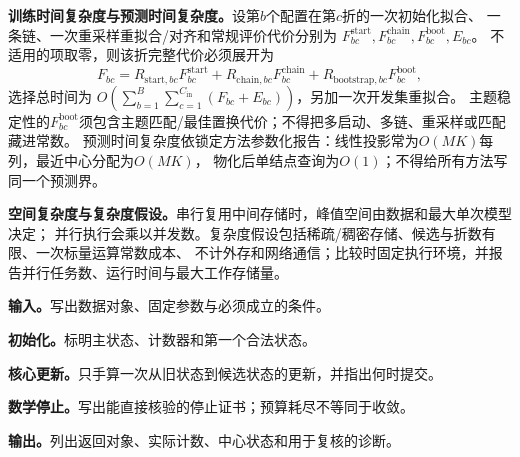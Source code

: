 \label{struct:V5-C08-CH26}
\textbf{训练时间复杂度与预测时间复杂度。}设第$b$个配置在第$c$折的一次初始化拟合、
一条链、一次重采样重拟合/对齐和常规评价代价分别为
$F^{\mathrm{start}}_{bc},F^{\mathrm{chain}}_{bc},F^{\mathrm{boot}}_{bc},E_{bc}$。
不适用的项取零，则该折完整代价必须展开为
\[
F_{bc}=R_{\mathrm{start},bc}F^{\mathrm{start}}_{bc}
+R_{\mathrm{chain},bc}F^{\mathrm{chain}}_{bc}
+R_{\mathrm{bootstrap},bc}F^{\mathrm{boot}}_{bc},
\]
选择总时间为
$O\!\left(\sum_{b=1}^{B}\sum_{c=1}^{C_{\mathrm{in}}}(F_{bc}+E_{bc})\right)$，另加一次开发集重拟合。
主题稳定性的$F^{\mathrm{boot}}_{bc}$须包含主题匹配/最佳置换代价；不得把多启动、多链、重采样或匹配藏进常数。
预测时间复杂度依锁定方法参数化报告：线性投影常为$O(MK)$每列，最近中心分配为$O(MK)$，
\PageRank{}物化后单结点查询为$O(1)$；不得给所有方法写同一个预测界。

\label{struct:V5-C08-CH27}
\textbf{空间复杂度与复杂度假设。}串行复用中间存储时，峰值空间由数据和最大单次模型决定；
并行执行会乘以并发数。复杂度假设包括稀疏/稠密存储、候选与折数有限、一次标量运算常数成本、
不计外存和网络通信；比较时固定执行环境，并报告并行任务数、运行时间与最大工作存储量。

\begingroup\SetAlgoLined

\begin{keypointbox}[title={协议A：开发集选择与一次锁定测试：五步阅读}]
\textbf{输入。}写出数据对象、固定参数与必须成立的条件。\par
\textbf{初始化。}标明主状态、计数器和第一个合法状态。\par
\textbf{核心更新。}只手算一次从旧状态到候选状态的更新，并指出何时提交。\par
\textbf{数学停止。}写出能直接核验的停止证书；预算耗尽不等同于收敛。\par
\textbf{输出。}列出返回对象、实际计数、中心状态和用于复核的诊断。
\end{keypointbox}

